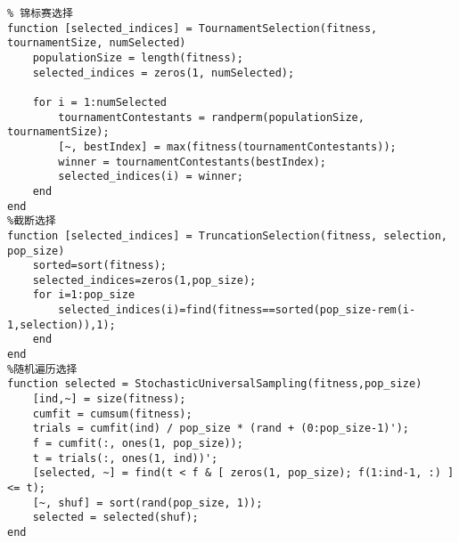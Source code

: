 \documentclass[withoutpreface,bwprint]{cumcmthesis} %
\begin{document}
\begin{appendices}
\begin{lstlisting}
% 锦标赛选择
function [selected_indices] = TournamentSelection(fitness, tournamentSize, numSelected)
    populationSize = length(fitness);
    selected_indices = zeros(1, numSelected);
    
    for i = 1:numSelected
        tournamentContestants = randperm(populationSize, tournamentSize);
        [~, bestIndex] = max(fitness(tournamentContestants));
        winner = tournamentContestants(bestIndex);
        selected_indices(i) = winner;
    end
end
%截断选择
function [selected_indices] = TruncationSelection(fitness, selection, pop_size)
    sorted=sort(fitness);
    selected_indices=zeros(1,pop_size);
    for i=1:pop_size
        selected_indices(i)=find(fitness==sorted(pop_size-rem(i-1,selection)),1);
    end
end
%随机遍历选择
function selected = StochasticUniversalSampling(fitness,pop_size)
    [ind,~] = size(fitness);
    cumfit = cumsum(fitness);
    trials = cumfit(ind) / pop_size * (rand + (0:pop_size-1)');
    f = cumfit(:, ones(1, pop_size));
    t = trials(:, ones(1, ind))';
    [selected, ~] = find(t < f & [ zeros(1, pop_size); f(1:ind-1, :) ] <= t);
    [~, shuf] = sort(rand(pop_size, 1));
    selected = selected(shuf);
end
\end{lstlisting}

\end{appendices}
\end{document}
